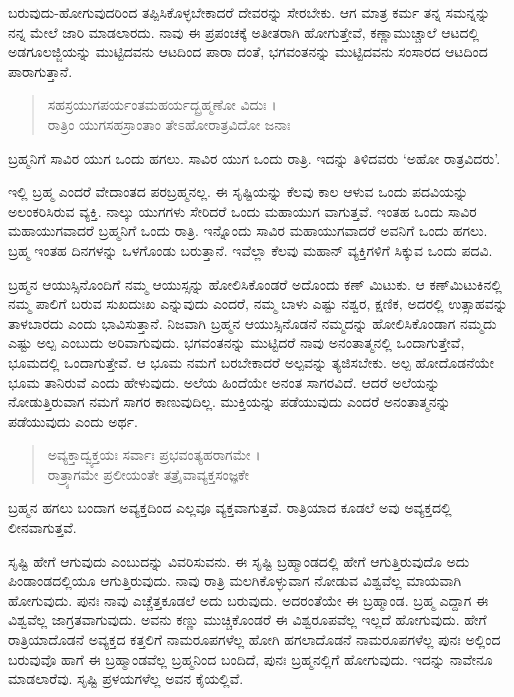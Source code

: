 ಬರುವುದು-ಹೋಗುವುದರಿಂದ ತಪ್ಪಿಸಿಕೊಳ್ಳಬೇಕಾದರೆ ದೇವರನ್ನು ಸೇರಬೇಕು. ಆಗ ಮಾತ್ರ ಕರ್ಮ ತನ್ನ ಸಮನ್ನನ್ನು ನನ್ನ ಮೇಲೆ ಜಾರಿ ಮಾಡಲಾರದು. ನಾವು ಈ ಪ್ರಪಂಚಕ್ಕೆ ಅತೀತರಾಗಿ ಹೋಗುತ್ತೇವೆ, ಕಣ್ಣಾಮುಚ್ಚಾಲೆ ಆಟದಲ್ಲಿ ಅಡಗೂಲಜ್ಜಿಯನ್ನು ಮುಟ್ಟಿದವನು ಆಟದಿಂದ ಪಾರಾ ದಂತೆ, ಭಗವಂತನನ್ನು ಮುಟ್ಟಿದವನು ಸಂಸಾರದ ಆಟದಿಂದ ಪಾರಾಗುತ್ತಾನೆ.

\begin{verse}
ಸಹಸ್ರಯುಗಪರ್ಯಂತಮಹರ್ಯದ್ಬ್ರಹ್ಮಣೋ ವಿದುಃ ।\\ರಾತ್ರಿಂ ಯುಗಸಹಸ್ರಾಂತಾಂ ತೇಽಹೋರಾತ್ರವಿದೋ ಜನಾಃ 
\end{verse}

{\small ಬ್ರಹ್ಮನಿಗೆ ಸಾವಿರ ಯುಗ ಒಂದು ಹಗಲು. ಸಾವಿರ ಯುಗ ಒಂದು ರಾತ್ರಿ. ಇದನ್ನು ತಿಳಿದವರು ‘ಅಹೋ ರಾತ್ರವಿದರು’.}

ಇಲ್ಲಿ ಬ್ರಹ್ಮ ಎಂದರೆ ವೇದಾಂತದ ಪರಬ್ರಹ್ಮನಲ್ಲ. ಈ ಸೃಷ್ಟಿಯನ್ನು ಕೆಲವು ಕಾಲ ಆಳುವ ಒಂದು ಪದವಿಯನ್ನು ಅಲಂಕರಿಸಿರುವ ವ್ಯಕ್ತಿ. ನಾಲ್ಕು ಯುಗಗಳು ಸೇರಿದರೆ ಒಂದು ಮಹಾಯುಗ ವಾಗುತ್ತವೆ. ಇಂತಹ ಒಂದು ಸಾವಿರ ಮಹಾಯುಗವಾದರೆ ಬ್ರಹ್ಮನಿಗೆ ಒಂದು ರಾತ್ರಿ. ಇನ್ನೊಂದು ಸಾವಿರ ಮಹಾಯುಗವಾದರೆ ಅವನಿಗೆ ಒಂದು ಹಗಲು. ಬ್ರಹ್ಮ ಇಂತಹ ದಿನಗಳನ್ನು ಒಳಗೊಂಡು ಬರುತ್ತಾನೆ. ಇವೆಲ್ಲಾ ಕೆಲವು ಮಹಾನ್ ವ್ಯಕ್ತಿಗಳಿಗೆ ಸಿಕ್ಕುವ ಒಂದು ಪದವಿ.

ಬ್ರಹ್ಮನ ಆಯುಸ್ಸಿನೊಂದಿಗೆ ನಮ್ಮ ಆಯುಸ್ಸನ್ನು ಹೋಲಿಸಿಕೊಂಡರೆ ಅದೊಂದು ಕಣ್ ಮಿಟುಕು. ಆ ಕಣ್​ಮಿಟುಕಿನಲ್ಲಿ ನಮ್ಮ ಪಾಲಿಗೆ ಬರುವ ಸುಖದುಃಖ ಎನ್ನುವುದು ಎಂದರೆ, ನಮ್ಮ ಬಾಳು ಎಷ್ಟು ನಶ್ವರ, ಕ್ಷಣಿಕ, ಅದರಲ್ಲಿ ಉತ್ಸಾಹವನ್ನು ತಾಳಬಾರದು ಎಂದು ಭಾವಿಸುತ್ತಾನೆ. ನಿಜವಾಗಿ ಬ್ರಹ್ಮನ ಆಯುಸ್ಸಿನೊಡನೆ ನಮ್ಮದನ್ನು ಹೋಲಿಸಿಕೊಂಡಾಗ ನಮ್ಮದು ಎಷ್ಟು ಅಲ್ಪ ಎಂಬುದು ಅರಿವಾಗುವುದು. ಭಗವಂತನನ್ನು ಮುಟ್ಟಿದರೆ ನಾವು ಅನಂತಾತ್ಮನಲ್ಲಿ ಒಂದಾಗುತ್ತೇವೆ, ಭೂಮದಲ್ಲಿ ಒಂದಾಗುತ್ತೇವೆ. ಆ ಭೂಮ ನಮಗೆ ಬರಬೇಕಾದರೆ ಅಲ್ಪವನ್ನು ತ್ಯಜಿಸಬೇಕು. ಅಲ್ಪ ಹೋದೊಡನೆಯೇ ಭೂಮ ತಾನಿರುವೆ ಎಂದು ಹೇಳುವುದು. ಅಲೆಯ ಹಿಂದೆಯೇ ಅನಂತ ಸಾಗರವಿದೆ. ಆದರೆ ಅಲೆಯನ್ನು ನೋಡುತ್ತಿರುವಾಗ ನಮಗೆ ಸಾಗರ ಕಾಣುವುದಿಲ್ಲ. ಮುಕ್ತಿಯನ್ನು ಪಡೆಯುವುದು ಎಂದರೆ ಅನಂತಾತ್ಮನನ್ನು ಪಡೆಯುವುದು ಎಂದು ಅರ್ಥ.

\begin{verse}
ಅವ್ಯಕ್ತಾದ್ವ್ಯಕ್ತಯಃ ಸರ್ವಾಃ ಪ್ರಭವಂತ್ಯಹರಾಗಮೇ ।\\ರಾತ್ರ್ಯಾಗಮೇ ಪ್ರಲೀಯಂತೇ ತತ್ರೈವಾವ್ಯಕ್ತಸಂಜ್ಞಕೇ 
\end{verse}

{\small ಬ್ರಹ್ಮನ ಹಗಲು ಬಂದಾಗ ಅವ್ಯಕ್ತದಿಂದ ಎಲ್ಲವೂ ವ್ಯಕ್ತವಾಗುತ್ತವೆ. ರಾತ್ರಿಯಾದ ಕೂಡಲೆ ಅವು ಅವ್ಯಕ್ತದಲ್ಲಿ ಲೀನವಾಗುತ್ತವೆ.}

ಸೃಷ್ಟಿ ಹೇಗೆ ಆಗುವುದು ಎಂಬುದನ್ನು ವಿವರಿಸುವನು. ಈ ಸೃಷ್ಟಿ ಬ್ರಹ್ಮಾಂಡದಲ್ಲಿ ಹೇಗೆ ಆಗುತ್ತಿರುವುದೊ ಅದು ಪಿಂಡಾಂಡದಲ್ಲಿಯೂ ಆಗುತ್ತಿರುವುದು. ನಾವು ರಾತ್ರಿ ಮಲಗಿಕೊಳ್ಳುವಾಗ ನೋಡುವ ವಿಶ್ವವೆಲ್ಲ ಮಾಯವಾಗಿ ಹೋಗುವುದು. ಪುನಃ ನಾವು ಎಚ್ಚೆತ್ತಕೂಡಲೆ ಅದು ಬರುವುದು. ಅದರಂತೆಯೇ ಈ ಬ್ರಹ್ಮಾಂಡ. ಬ್ರಹ್ಮ ಎದ್ದಾಗ ಈ ವಿಶ್ವವೆಲ್ಲ ಜಾಗ್ರತವಾಗುವುದು. ಅವನು ಕಣ್ಣು ಮುಚ್ಚಿಕೊಂಡರೆ ಈ ವಿಶ್ವರೂಪವೆಲ್ಲ ಇಲ್ಲದೆ ಹೋಗುವುದು. ಹೇಗೆ ರಾತ್ರಿಯಾದೊಡನೆ ಅವ್ಯಕ್ತದ ಕತ್ತಲಿಗೆ ನಾಮರೂಪಗಳೆಲ್ಲ ಹೋಗಿ ಹಗಲಾದೊಡನೆ ನಾಮರೂಪಗಳೆಲ್ಲ ಪುನಃ ಅಲ್ಲಿಂದ ಬರುವುವೊ ಹಾಗೆ ಈ ಬ್ರಹ್ಮಾಂಡವೆಲ್ಲ ಬ್ರಹ್ಮನಿಂದ ಬಂದಿದೆ, ಪುನಃ ಬ್ರಹ್ಮನಲ್ಲಿಗೆ ಹೋಗುವುದು. ಇದನ್ನು ನಾವೇನೂ ಮಾಡಲಾರೆವು. ಸೃಷ್ಟಿ ಪ್ರಳಯಗಳೆಲ್ಲ ಅವನ ಕೈಯಲ್ಲಿವೆ.

